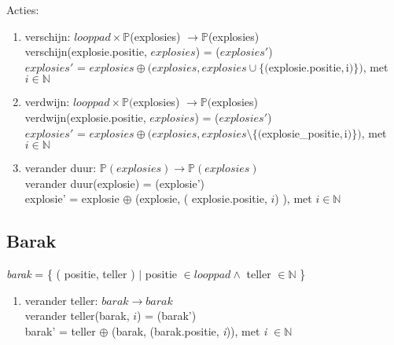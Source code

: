 Acties:
\begin{enumerate}
 \item verschijn: $looppad \times \mathbb{P}$(explosies) $\rightarrow \mathbb{P}$(explosies) \\
       verschijn(explosie.positie, $explosies$) = ($explosies'$) \\
       $explosies'$ = $explosies \oplus ( explosies, explosies \cup \{ ( $explosie.positie$, $i$ )  \} )$, met $i \in \mathbb{N}$ \\
 \item verdwijn: $looppad\times \mathbb{P}($explosies) $\rightarrow \mathbb{P}($explosies) \\
       verdwijn(explosie.positie, $explosies$) = ($explosies'$) \\
       $explosies'$ = $explosies \oplus ( explosies, explosies \setminus \{  ($explosie\_positie$, $i$) \} )$, met $i \in \mathbb{N}$ \\
 \item verander duur: $\mathbb{P}( explosies ) \rightarrow \mathbb{P}(explosies)$ \\
       verander duur(explosie) = (explosie') \\
       explosie' = explosie $\oplus$ (explosie, ( explosie.positie, $i$) ), met $i \in \mathbb{N}$ \\
\end{enumerate}

\subsection{Barak}\label{sub:barak} %

\emph{barak} = \{ ( positie, teller ) $|$ positie $\in looppad \land$ teller $\in \mathbb{N}$ \} \\

\begin{enumerate}
    \item verander teller: $barak \rightarrow barak$ \\
 verander teller(barak, $i$) = (barak') \\
 barak' = teller $\oplus$ (barak, (barak.positie, \emph{i})), met  \emph{i} $\in \mathbb{N}$\\
\end{enumerate}


